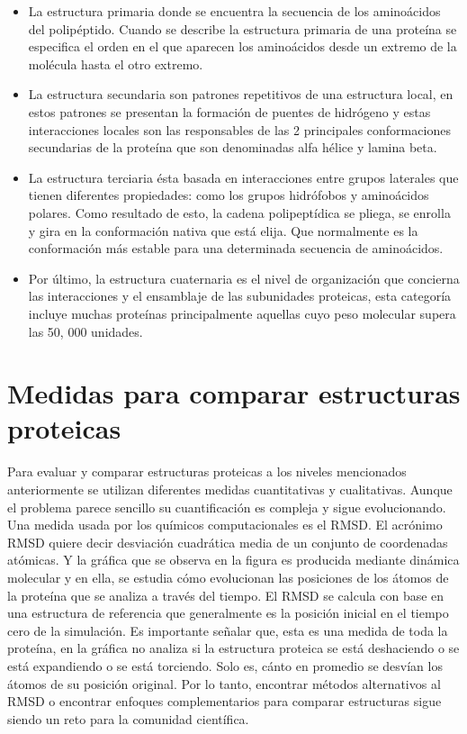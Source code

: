 \begin{itemize}

\item La estructura primaria donde se encuentra la secuencia de los
amino\'{a}cidos del polip\'{e}ptido. Cuando se describe la estructura primaria de una prote\'{i}na se especiﬁca el
orden en el que aparecen los amino\'{a}cidos desde un extremo de la mol\'{e}cula hasta el otro extremo.

\item La estructura secundaria son patrones repetitivos de una estructura local, en estos
patrones se presentan la formaci\'{o}n de puentes de hidr\'{o}geno y estas interacciones locales son las
responsables de las 2 principales conformaciones secundarias de la prote\'{i}na que son denominadas alfa
h\'{e}lice y lamina beta.


\item La estructura terciaria \'{e}sta basada en interacciones entre grupos laterales que tienen diferentes
propiedades: como los grupos hidr\'{o}fobos y amino\'{a}cidos polares. Como resultado de esto, la cadena
polipept\'{i}dica se pliega, se enrolla y gira en la conformaci\'{o}n nativa que est\'{a} elija. Que normalmente es la
conformaci\'{o}n m\'{a}s estable para una determinada secuencia de amino\'{a}cidos.


\item Por último, la estructura cuaternaria es el nivel de organizaci\'{o}n que concierna las
interacciones y el ensamblaje de las subunidades proteicas, esta categor\'{i}a incluye muchas prote\'{i}nas
principalmente aquellas cuyo peso molecular supera las 50, 000 unidades.

\end{itemize}

\section{Medidas para comparar estructuras proteicas}

Para evaluar y comparar estructuras proteicas a los niveles mencionados anteriormente se utilizan
diferentes medidas cuantitativas y cualitativas. Aunque el problema parece sencillo su cuantiﬁcaci\'{o}n es
compleja y sigue evolucionando. Una medida usada por los qu\'{i}micos computacionales es el RMSD. El acrónimo RMSD quiere decir desviación
cuadrática media de un conjunto de coordenadas atómicas. Y la gr\'{a}ﬁca que se observa en la figura 
es producida mediante dinámica molecular y en ella, se estudia cómo evolucionan las posiciones de los
átomos de la proteína que se analiza a través del tiempo. El RMSD se calcula con base en una estructura
de referencia que generalmente es la posición inicial en el tiempo cero de la simulación.
Es importante señalar que, esta es una medida de toda la proteína, en la gr\'{a}ﬁca no analiza si la estructura
proteica se está deshaciendo o se est\'{a} expandiendo o se está torciendo. Solo es, c\'{a}nto en promedio se desvían los \'{a}tomos de su posición original. Por lo tanto, encontrar
m\'{e}todos alternativos al RMSD o encontrar enfoques complementarios para comparar estructuras
sigue siendo un reto para la comunidad cient\'{i}ﬁca.